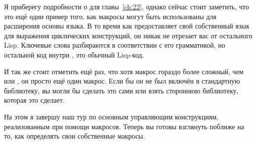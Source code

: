 Я приберегу подробности о  для главы~\ref{ch:22}, однако сейчас стоит заметить,
что это ещё один пример того, как макросы могут быть использованы для расширения основы
языка. В то время как  предоставляет свой собственный язык для выражения
циклических конструкций, он никак не отрезает вас от остального Lisp. Ключевые слова
 разбираются в соответствии с его грамматикой, но остальной код внутри
, это обычный Lisp-код.

И так же стоит отметить ещё раз, что хотя макрос  гораздо более сложный, чем
 или , он просто ещё один макрос. Если бы он не был включён в
стандартную библиотеку, вы могли бы сделать это сами или взять стороннюю библиотеку,
которая это сделает.

На этом я завершу наш тур по основным управляющим конструкциям, реализованным при помощи
макросов. Теперь вы готовы взглянуть поближе на то, как определять свои собственные
макросы.

